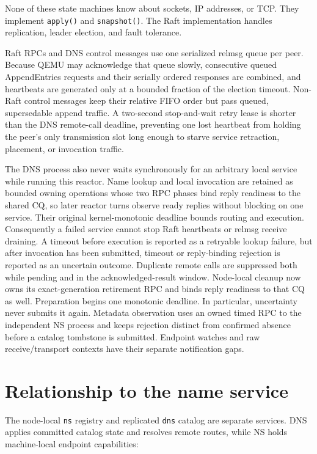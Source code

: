 None of these state machines know about sockets, IP addresses, or TCP. They
implement \texttt{apply()} and \texttt{snapshot()}. The Raft implementation handles
replication, leader election, and fault tolerance.

Raft RPCs and DNS control messages use one serialized relmsg queue per peer.
Because QEMU may acknowledge that queue slowly, consecutive queued
AppendEntries requests and their serially ordered responses are combined, and
heartbeats are generated only at a bounded fraction of the election timeout.
Non-Raft control messages keep their relative FIFO order but pass queued,
supersedable append traffic. A two-second stop-and-wait retry lease is shorter
than the DNS remote-call deadline, preventing one lost heartbeat from holding
the peer's only transmission slot long enough to starve service retraction,
placement, or invocation traffic.

The DNS process also never waits synchronously for an arbitrary local service
while running this reactor. Name lookup and local invocation are retained as
bounded owning operations whose two RPC phases bind reply readiness to the
shared CQ, so later reactor turns observe ready replies without blocking on one
service. Their original kernel-monotonic deadline bounds routing and execution. Consequently a failed
service cannot stop Raft heartbeats or relmsg receive draining. A timeout before
execution is reported as a retryable lookup failure, but after invocation has been
submitted, timeout or reply-binding rejection is reported as an uncertain outcome. Duplicate remote calls are
suppressed both while pending and in the acknowledged-result window.
Node-local cleanup now owns its exact-generation retirement RPC and binds reply
readiness to that CQ as well. Preparation begins one monotonic deadline. In particular,
uncertainty never submits it again. Metadata observation uses an owned timed RPC
to the independent NS process and keeps rejection distinct from confirmed
absence before a catalog tombstone is submitted. Endpoint watches and raw
receive/transport contexts have their separate notification gaps.

\section{Relationship to the name service}

The node-local \texttt{ns} registry and replicated \texttt{dns} catalog are
separate services. DNS applies committed catalog state and resolves remote routes, while
NS holds machine-local endpoint capabilities:

